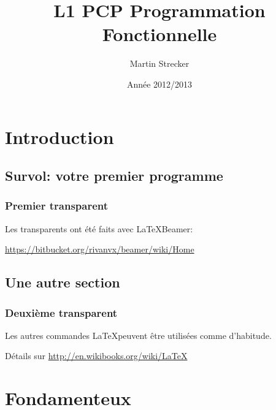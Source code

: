 \documentclass{beamer}
\title[Progr. Fonction.]{L1 PCP Programmation Fonctionnelle}
\author{Martin Strecker}
\institute{Université de Toulouse/IRIT}
\date{Année 2012/2013}
\begin{document}
\begin{frame}
  \titlepage
\end{frame}

\section{Introduction}\label{sec:intro}

\subsection{Survol: votre premier programme}

\begin{frame}[fragile]\frametitle{Premier transparent}

Les transparents ont été faits avec \LaTeX Beamer:

\href{https://bitbucket.org/rivanvx/beamer/wiki/Home}{https://bitbucket.org/rivanvx/beamer/wiki/Home}

\end{frame}

\subsection{Une autre section}

\begin{frame}[fragile]\frametitle{Deuxième transparent}

Les autres commandes \LaTeX peuvent être utilisées comme d'habitude. 

Détails sur 
\href{http://en.wikibooks.org/wiki/LaTeX}{http://en.wikibooks.org/wiki/LaTeX}

\end{frame}



\section{Fondamenteux}
\end{document}
